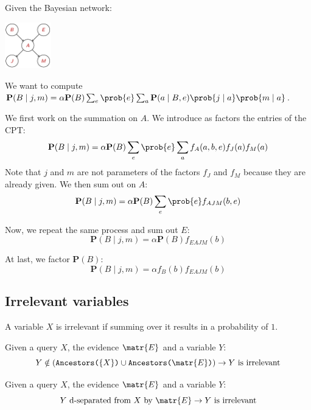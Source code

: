 \begin{example}[Burglary]
    Given the Bayesian network:
    \begin{center}
        \includegraphics[width=0.15\textwidth]{img/_burglary_net.pdf}
    \end{center}
    We want to compute 
    $\textbf{P}(B \mid j, m) = \alpha \textbf{P}(B) \sum_{e} \prob{e} \sum_{a} \textbf{P}(a \mid B, e) \prob{j \mid a} \prob{m \mid a}$.
    
    We first work on the summation on $A$.
    We introduce as factors the entries of the CPT:
        \[ \textbf{P}(B \mid j, m) = \alpha \textbf{P}(B) \sum_{e} \prob{e} \sum_{a} f_A(a, b, e) f_J(a) f_M(a) \]
    Note that $j$ and $m$ are not parameters of the factors $f_J$ and $f_M$ because they are already given.
    We then sum out on $A$:
        \[ \textbf{P}(B \mid j, m) = \alpha \textbf{P}(B) \sum_{e} \prob{e} f_{AJM}(b, e) \]

    Now, we repeat the same process and sum out $E$:
        \[ \textbf{P}(B \mid j, m) = \alpha \textbf{P}(B) f_{EAJM}(b) \]

    At last, we factor $\textbf{P}(B)$:
        \[ \textbf{P}(B \mid j, m) = \alpha f_B(b) f_{EAJM}(b) \]
\end{example}


\subsection{Irrelevant variables}
A variable $X$ is irrelevant if summing over it results in a probability of $1$.

\begin{theorem}
    Given a query $X$, the evidence $\matr{E}$ and a variable $Y$:
        \[ Y \notin (\texttt{Ancestors($\{ X \}$)} \cup  \texttt{Ancestors($\matr{E}$)}) \rightarrow Y \text{ is irrelevant} \]
\end{theorem}

\begin{theorem}
    Given a query $X$, the evidence $\matr{E}$ and a variable $Y$:
    \[ Y \text{ d-separated from } X \text{ by } \matr{E} \rightarrow Y \text{ is irrelevant} \]
\end{theorem}


